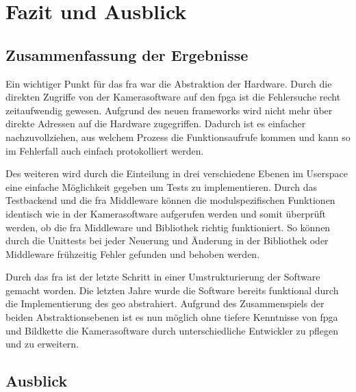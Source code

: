 \chapter{Fazit und Ausblick}


\section{Zusammenfassung der Ergebnisse}

Ein wichtiger Punkt für das \ac{fra} war die Abstraktion der Hardware. Durch die direkten Zugriffe von der Kamerasoftware auf den \ac{fpga} ist die Fehlersuche recht zeitaufwendig gewesen. Aufgrund des neuen \glspl{framework} wird nicht mehr über direkte Adressen auf die Hardware zugegriffen. Dadurch ist es einfacher nachzuvollziehen, aus welchem Prozess die Funktionsaufrufe kommen und kann so im Fehlerfall auch einfach protokolliert werden.


Des weiteren wird durch die Einteilung in drei verschiedene Ebenen im Userspace eine einfache Möglichkeit gegeben um Tests zu implementieren. Durch das Testbackend und die \ac{fra} Middleware können die modulspezifischen Funktionen identisch wie in der Kamerasoftware aufgerufen werden und somit überprüft werden, ob die \ac{fra} Middleware und Bibliothek richtig funktioniert. So können durch die Unittests bei jeder Neuerung und Änderung in der Bibliothek oder Middleware frühzeitig Fehler gefunden und behoben werden.


Durch das \ac{fra} ist der letzte Schritt in einer Umstrukturierung der Software gemacht worden. Die letzten Jahre wurde die Software bereits funktional durch die Implementierung des \ac{geo} abstrahiert. Aufgrund des Zusammenspiels der beiden Abstraktionsebenen ist es nun möglich ohne tiefere Kenntnisse von \ac{fpga} und Bildkette die Kamerasoftware durch unterschiedliche Entwickler zu pflegen und zu erweitern.


\section{Ausblick}


